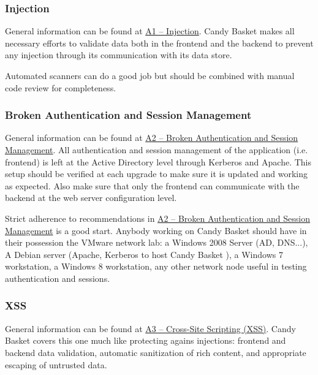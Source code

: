\documentclass[letterpaper,10pt,english]{sphinxmanual}
\begin{document}
\subsubsection{Injection}
\label{developer-guide:injection}
General information can be found at \href{https://owasp.org/index.php/Top\_10\_2013-A1-Injection}{A1 -- Injection}. Candy Basket
makes all necessary efforts to validate data both in the frontend and
the backend to prevent any injection through its communication with
its data store.

Automated scanners can do a good job but should be combined with
manual code review for completeness.


\subsubsection{Broken Authentication and Session Management}
\label{developer-guide:broken-authentication-and-session-management}
General information can be found at \href{https://owasp.org/index.php/Top\_10\_2013-A2-Broken\_Authentication\_and\_Session\_Management}{A2 -- Broken Authentication and
Session Management}. All
authentication and session management of the application
(i.e. frontend) is left at the Active Directory level through Kerberos
and Apache. This setup should be verified at each upgrade to make sure
it is updated and working as expected. Also make sure that only the
frontend can communicate with the backend at the web server
configuration level.

Strict adherence to recommendations in \href{https://owasp.org/index.php/Top\_10\_2013-A2-Broken\_Authentication\_and\_Session\_Management}{A2 -- Broken Authentication
and Session Management}
is a good start. Anybody working on Candy Basket should have in their
possession the VMware network lab: a Windows 2008 Server (AD, DNS...),
A Debian server (Apache, Kerberos to host Candy Basket ), a Windows 7
workstation, a Windows 8 workstation, any other network node useful in
testing authentication and sessions.


\subsubsection{XSS}
\label{developer-guide:xss}
General information can be found at \href{https://owasp.org/index.php/Top\_10\_2013-A3-Cross-Site\_Scripting\_(XSS)}{A3 -- Cross-Site Scripting (XSS)}. Candy
Basket covers this one much like protecting agains injections:
frontend and backend data validation, automatic sanitization of rich
content, and appropriate escaping of untrusted data.
\end{document}
